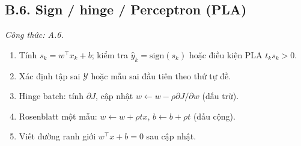 \subsection*{B.6. Sign / hinge / Perceptron (PLA)}
\textit{Công thức: A.6.}
\begin{enumerate}
  \item Tính \(s_k=w^\top x_k+b\); kiểm tra \(\hat y_k=\mathrm{sign}(s_k)\) hoặc điều kiện PLA \(t_k s_k>0\).
  \item Xác định tập sai \(\mathcal Y\) hoặc mẫu sai đầu tiên theo thứ tự đề.
  \item Hinge batch: tính \(\partial J\), cập nhật \(w\leftarrow w-\rho\partial J/\partial w\) (dấu trừ).
  \item Rosenblatt một mẫu: \(w\leftarrow w+\rho t x\), \(b\leftarrow b+\rho t\) (dấu cộng).
  \item Viết đường ranh giới \(w^\top x+b=0\) sau cập nhật.
\end{enumerate}
